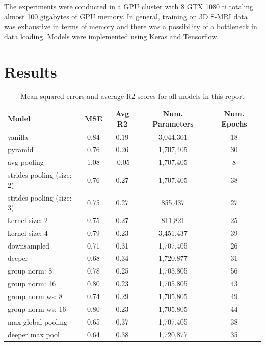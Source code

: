 \documentclass{article}
\begin{document}
    The experiments were conducted in a GPU cluster with 8 GTX 1080 ti totaling almost 100 gigabytes of GPU memory. 
    In general, training on 3D S-MRI data was exhaustive in terms of memory and there was a possibility of a bottleneck in data loading. 
    Models were implemented using Keras and Tensorflow.
    \section*{Results}
    \begin{table}[h!]
        \begin{tabular}{||l c c c c||}
            \hline
            Model & MSE & Avg R2 & Num. Parameters & Num. Epochs \\
            \hline\hline
            vanilla & 0.84 & 0.19 & 3,044,301 & 18 \\
            \hline
            pyramid & 0.76 & 0.26 & 1,707,405 & 30 \\
            \hline
            avg pooling & 1.08 & -0.05 & 1,707,405 & 8 \\
            \hline
            strides pooling (size: 2) & 0.76 & 0.27 & 1,707,405 & 38 \\
            \hline
            strides pooling (size: 3) & 0.75 & 0.27 & 855,437 & 27 \\
            \hline
            kernel size: 2 & 0.75 & 0.27 & 811,821 & 25 \\
            \hline
            kernel size: 4 & 0.79 & 0.23 & 3,451,437 & 39 \\
            \hline
            downsampled & 0.71 & 0.31 & 1,707,405 & 26 \\
            \hline
            deeper & 0.68 & 0.34 & 1,720,877 & 31 \\
            \hline
            group norm: 8 & 0.78 & 0.25 & 1,705,805 & 56 \\
            \hline
            group norm: 16 & 0.80 & 0.23 & 1,705,805 & 43 \\
            \hline
            group norm ws: 8 & 0.74 & 0.29 & 1,705,805 & 49 \\
            \hline
            group norm ws: 16 & 0.80 & 0.23 & 1,705,805 & 44 \\ 
            \hline
            max global pooling & 0.65 & 0.37 & 1,707,405 & 38 \\
            \hline
            deeper max pool & 0.64 & 0.38 & 1,720,877 & 35 \\
            \hline
        \end{tabular}
        \caption{Mean-squared errors and average R2 scores for all models in this report}
        \label{table:1}
    \end{table}
    
\end{document}
